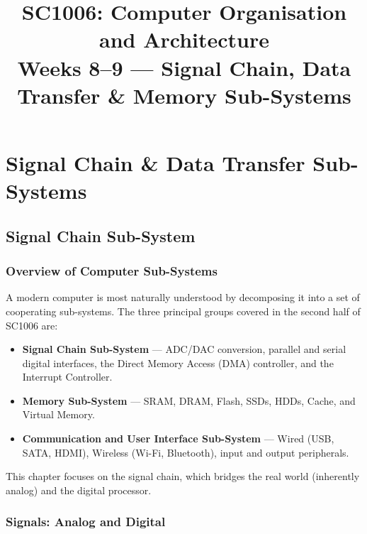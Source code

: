 \documentclass[11pt, a4paper, notitlepage]{report}
\title{\textbf{SC1006: Computer Organisation and Architecture}\\[0.5em]
       \large Weeks 8--9 — Signal Chain, Data Transfer \& Memory Sub-Systems}
\author{}
\date{}
\makeatletter
\theoremstyle{definition}
\theoremstyle{remark}
\theoremstyle{definition}
\renewcommand\tableofcontents{%
  \section*{\contentsname}%
  \@starttoc{toc}%
}
\makeatother
\begin{document}
\maketitle
\tableofcontents

\setcounter{chapter}{8}

\chapter{Signal Chain \& Data Transfer Sub-Systems}
\label{ch:week9-signal}

\section{Signal Chain Sub-System}
\label{ch:signal-chain}

\subsection{Overview of Computer Sub-Systems}
\label{sec:subsystems-overview}

A modern computer is most naturally understood by decomposing it into a set of cooperating sub-systems. The three principal groups covered in the second half of SC1006 are:

\begin{itemize}
  \item \textbf{Signal Chain Sub-System} — ADC/DAC conversion, parallel and serial digital interfaces, the Direct Memory Access (DMA) controller, and the Interrupt Controller.
  \item \textbf{Memory Sub-System} — SRAM, DRAM, Flash, SSDs, HDDs, Cache, and Virtual Memory.
  \item \textbf{Communication and User Interface Sub-System} — Wired (USB, SATA, HDMI), Wireless (Wi-Fi, Bluetooth), input and output peripherals.
\end{itemize}

This chapter focuses on the signal chain, which bridges the real world (inherently analog) and the digital processor.

\subsection{Signals: Analog and Digital}
\label{sec:signals}
\end{document}
